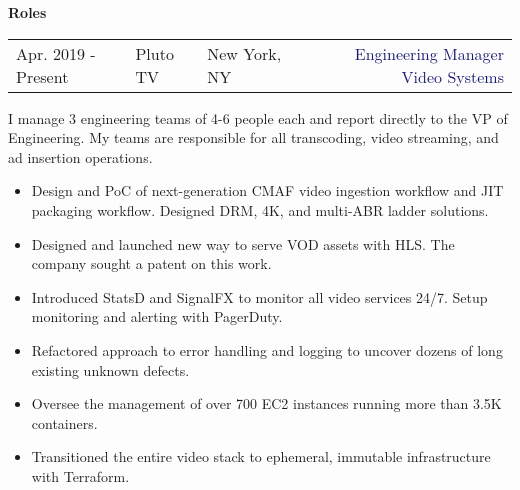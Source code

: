 \documentclass{article}
\begin{document}
\vspace{10pt}\textbf{Roles}

\vspace{5pt}\begin{tabularx}{\textwidth}{@{}lllXr}
  Apr. 2019 - Present&\textcolor{Mahogany}{Pluto TV}&\textcolor{Black!80}{New York, NY}&&\textcolor{MidnightBlue}{Engineering Manager Video Systems}
\end{tabularx}

\vspace{3pt} I manage 3 engineering teams of 4-6 people each and report directly to the VP of Engineering. My teams are responsible for
all transcoding, video streaming, and ad insertion operations.
\begin{multicols}{2}
  \begin{small}
    \begin{itemize}[leftmargin=*,label=\tiny{$\bullet$}]
    \item\begin{minipage}[t]{\linewidth}{Design and PoC of next-generation CMAF video ingestion workflow and JIT packaging workflow.
        Designed DRM, 4K, and multi-ABR ladder solutions.}\end{minipage}
    \item\begin{minipage}[t]{\linewidth}{Designed and launched new way to serve VOD assets with HLS. The company sought a patent on this work.}\end{minipage}
    \item\begin{minipage}[t]{\linewidth}{Introduced StatsD and SignalFX to monitor all video services 24/7. Setup monitoring
        and alerting with PagerDuty.}\end{minipage}
    \item\begin{minipage}[t]{\linewidth}{Refactored approach to error handling and logging to uncover dozens of long existing unknown defects.}\end{minipage}
    \item\begin{minipage}[t]{\linewidth}{Oversee the management of over 700 EC2 instances running more than 3.5K containers.}\end{minipage}
    \item\begin{minipage}[t]{\linewidth}{Transitioned the entire video stack to ephemeral, immutable infrastructure with Terraform.}\end{minipage}

\end{itemize}
\end{small}
\end{multicols}
\end{document}
